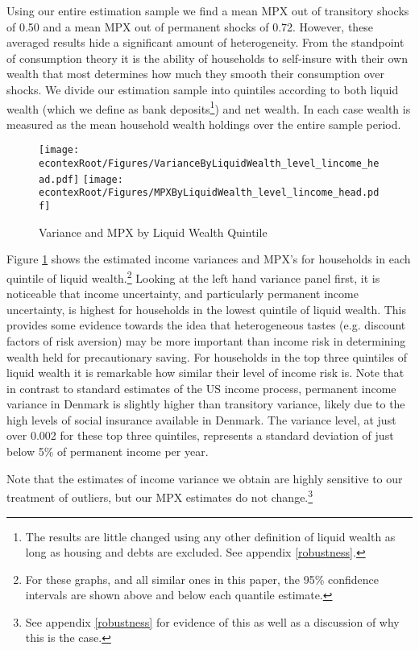 \documentclass[titlepage]{\econtex}\newcommand{\texname}{ConsumptionHeterogeneity}
\begin{document}
Using our entire estimation sample we find a mean MPX out of transitory shocks of 0.50 and a mean MPX out of permanent shocks of 0.72. However, these averaged results hide a significant amount of heterogeneity. From the standpoint of consumption theory it is the ability of households to self-insure with their own wealth that most determines how much they smooth their consumption over shocks. We divide our estimation sample into quintiles according to both liquid wealth (which we define as bank deposits\footnote{The results are little changed using any other definition of liquid wealth as long as housing and debts are excluded. See appendix \ref{robustness}.}) and net wealth. In each case wealth is measured as the mean household wealth holdings over the entire sample period.
\begin{figure}
	\centering
	\texttt{[image: \\econtexRoot/Figures/VarianceByLiquidWealth\_level\_lincome\_head.pdf]}
	\centering
	\texttt{[image: \\econtexRoot/Figures/MPXByLiquidWealth\_level\_lincome\_head.pdf]}
	\caption{Variance and MPX by Liquid Wealth Quintile}
	\label{fig:MPXByLiquidWealth}
\end{figure}

Figure \ref{fig:MPXByLiquidWealth} shows the estimated income variances and MPX's for households in each quintile of liquid wealth.\footnote{For these graphs, and all similar ones in this paper, the 95\% confidence intervals are shown above and below each quantile estimate.} Looking at the left hand variance panel first, it is noticeable that income uncertainty, and particularly permanent income uncertainty, is highest for households in the lowest quintile of liquid wealth. This provides some evidence towards the idea that heterogeneous tastes (e.g. discount factors of risk aversion) may be more important than income risk in determining wealth held for precautionary saving. For households in the top three quintiles of liquid wealth it is remarkable how similar their level of income risk is. Note that in contrast to standard estimates of the US income process, permanent income variance in Denmark is slightly higher than transitory variance, likely due to the high levels of social insurance available in Denmark. The variance level, at just over 0.002 for these top three quintiles, represents a standard deviation of just below 5\% of permanent income per year.

Note that the estimates of income variance we obtain are highly sensitive to our treatment of outliers, but our MPX estimates do not change.\footnote{See appendix \ref{robustness} for evidence of this as well as a discussion of why this is the case.}
\end{document}
